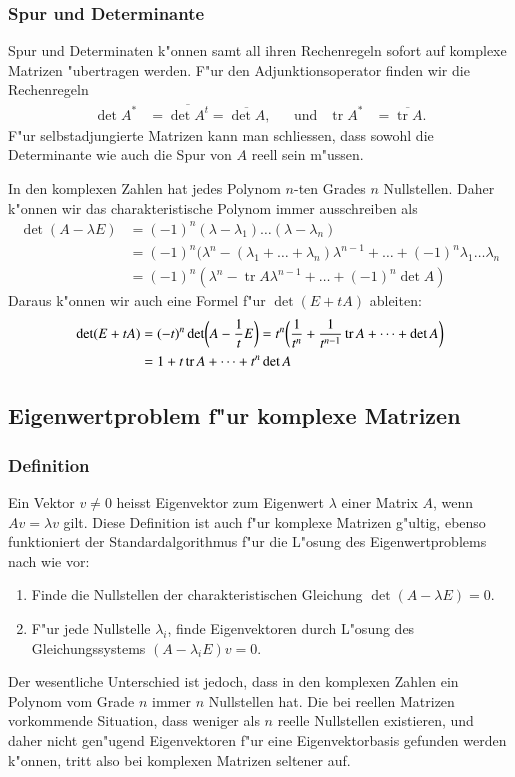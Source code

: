 \subsubsection{Spur und Determinante}
Spur und Determinaten k"onnen samt all ihren Rechenregeln sofort auf
komplexe Matrizen "ubertragen werden.
F"ur den Adjunktionsoperator finden wir die Rechenregeln
\begin{align*}
\det A^*&= \overline{\det A^t}=\overline{\det A},
&&\text{und}&
\operatorname{tr} A^*&=\overline{\operatorname{tr}A}.
\end{align*}
F"ur selbstadjungierte Matrizen kann man schliessen, dass sowohl
die Determinante wie auch die Spur von $A$ reell sein m"ussen.

In den komplexen Zahlen hat jedes Polynom $n$-ten Grades $n$ Nullstellen.
Daher k"onnen wir das charakteristische Polynom immer ausschreiben als
\begin{align*}
\det(A-\lambda E)
&=
(-1)^n (\lambda-\lambda_1)\dots(\lambda-\lambda_n)
\\
&=
(-1)^n(\lambda^n -(\lambda_1+\dots+\lambda_n)\lambda^{n-1}+\dots
+(-1)^n\lambda_1\dots\lambda_n
\\
&=
(-1)^n(\lambda^n - \operatorname{tr}A\lambda^{n-1}+\dots + (-1)^n\det A)
\end{align*}
Daraus k"onnen wir auch eine Formel f"ur $\det(E+tA)$ ableiten:
\begin{align}
\det(E+tA)
&=
(-t)^n\det\biggl(A-\frac1tE\biggr)
=
t^n\biggl(
\frac1{t^n}+\frac1{t^{n-1}}\operatorname{tr}A+\dots+\det A
\biggr)
\notag
\\
&=
1+t\operatorname{tr}A+\dots+t^n\operatorname{det}A
\label{skript:detandtrace}
\end{align}

%
%
\subsection{Eigenwertproblem f"ur komplexe Matrizen}
\subsubsection{Definition}
Ein Vektor $v\ne 0$ heisst Eigenvektor zum Eigenwert $\lambda$ einer
Matrix $A$, wenn $Av=\lambda v$ gilt. Diese Definition ist auch f"ur
komplexe Matrizen g"ultig, ebenso funktioniert der Standardalgorithmus
f"ur die L"osung des Eigenwertproblems nach wie vor:
\begin{enumerate}
\item Finde die Nullstellen der charakteristischen Gleichung
$\det(A-\lambda E)=0$.
\item F"ur jede Nullstelle $\lambda_i$, finde Eigenvektoren
durch L"osung des Gleichungssystems $(A-\lambda_i E)v=0$.
\end{enumerate}
Der wesentliche Unterschied ist jedoch, dass in den komplexen
Zahlen ein Polynom vom Grade $n$ immer $n$ Nullstellen hat.
Die bei reellen Matrizen vorkommende Situation, dass weniger
als $n$ reelle Nullstellen existieren, und daher nicht gen"ugend
Eigenvektoren f"ur eine Eigenvektorbasis gefunden werden k"onnen,
tritt also bei komplexen Matrizen seltener auf.

